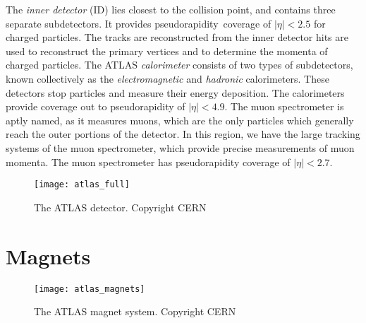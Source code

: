 The \textit{inner detector} (ID) lies closest to the collision point, and contains three separate subdetectors.
It provides pseudorapidity\footnotemark~coverage of $|\eta| < 2.5$ for charged particles.
The tracks are reconstructed from the inner detector hits are used to reconstruct the primary vertices and to determine the momenta of charged particles.
The ATLAS \textit{calorimeter} consists of two types of subdetectors, known collectively as the \textit{electromagnetic} and \textit{hadronic} calorimeters.
These detectors stop particles and measure their energy deposition.
The calorimeters provide coverage out to pseudorapidity of $|\eta| < 4.9$.
The muon spectrometer is aptly named, as it measures  muons, which are the only particles which generally reach the outer portions of the detector.
In this region, we have the large tracking systems of the muon spectrometer, which provide precise measurements of muon momenta.
The muon spectrometer has pseudorapidity coverage of $|\eta| < 2.7$.

\begin{figure}[tbp]
\caption{The ATLAS detector. Copyright CERN} \label{fig:atlas_full}
\texttt{[image: atlas\_full]}
\end{figure}

\section{Magnets}

\begin{figure}[tbp]
\caption{The ATLAS magnet system. Copyright CERN} \label{fig:atlas_magnets}
\texttt{[image: atlas\_magnets]}
\end{figure}


